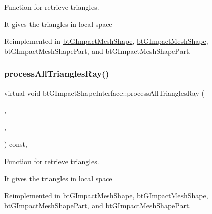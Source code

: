Function for retrieve triangles. 

It gives the triangles in local space 

Reimplemented in \hyperlink{classbtGImpactMeshShape_ab7221f209f9d10d2f1eb80cca5aee55d}{bt\+G\+Impact\+Mesh\+Shape}, \hyperlink{classbtGImpactMeshShape_a0c02d97f918e04fdb0e59d310861f119}{bt\+G\+Impact\+Mesh\+Shape}, \hyperlink{classbtGImpactMeshShapePart_a63c6db1d4458384ef776784a79eaf8f8}{bt\+G\+Impact\+Mesh\+Shape\+Part}, and \hyperlink{classbtGImpactMeshShapePart_a5a7308f0d61d403394d909b45506a7e9}{bt\+G\+Impact\+Mesh\+Shape\+Part}.

\mbox{\label{classbtGImpactShapeInterface_af67273183582c6696169ee4ae5d6cf37}} 
\subsubsection{\texorpdfstring{process\+All\+Triangles\+Ray()}{processAllTrianglesRay()}\hspace{0.1cm}{\footnotesize\ttfamily [2/2]}}
{\footnotesize\ttfamily virtual void bt\+G\+Impact\+Shape\+Interface\+::process\+All\+Triangles\+Ray (\begin{DoxyParamCaption}\item[{\hyperlink{classbtTriangleCallback}{bt\+Triangle\+Callback} $\ast$}]{,  }\item[{const bt\+Vector3 \&}]{,  }\item[{const bt\+Vector3 \&}]{ }\end{DoxyParamCaption}) const\hspace{0.3cm}{\ttfamily [inline]}, {\ttfamily [virtual]}}



Function for retrieve triangles. 

It gives the triangles in local space 

Reimplemented in \hyperlink{classbtGImpactMeshShape_ab7221f209f9d10d2f1eb80cca5aee55d}{bt\+G\+Impact\+Mesh\+Shape}, \hyperlink{classbtGImpactMeshShape_a0c02d97f918e04fdb0e59d310861f119}{bt\+G\+Impact\+Mesh\+Shape}, \hyperlink{classbtGImpactMeshShapePart_a63c6db1d4458384ef776784a79eaf8f8}{bt\+G\+Impact\+Mesh\+Shape\+Part}, and \hyperlink{classbtGImpactMeshShapePart_a5a7308f0d61d403394d909b45506a7e9}{bt\+G\+Impact\+Mesh\+Shape\+Part}.

